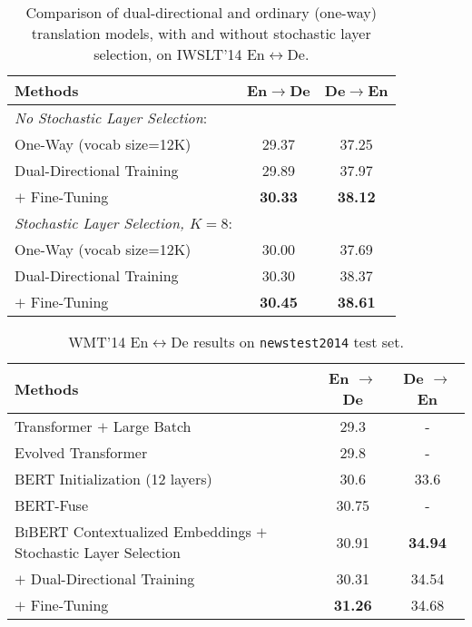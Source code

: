 \documentclass[11pt]{article}
\begin{document}
\begin{table}[ht]
\begin{small}
\centering
\begin{tabular}{lcc}
\hline
Methods  & En$\rightarrow$De & De$\rightarrow$En \\ 
\hline
\textit{No Stochastic Layer Selection}:  &    &    \\ 
\hline
\multicolumn{1}{l|}{One-Way (vocab size=12K)} & \multicolumn{1}{c}{29.37}   & 37.25 \\
\multicolumn{1}{l|}{Dual-Directional Training} & 29.89 & 37.97 \\
\multicolumn{1}{l|}{\quad $+$ Fine-Tuning} & \multicolumn{1}{c}{\textbf{30.33}} & \textbf{\textbf{38.12}} \\

\hline
\textit{Stochastic Layer Selection, $K=8$}:  &    &    \\ 
\hline
\multicolumn{1}{l|}{One-Way (vocab size=12K)} & \multicolumn{1}{c}{30.00}   & 37.69 \\
\multicolumn{1}{l|}{Dual-Directional Training} & 30.30 & 38.37 \\
\multicolumn{1}{l|}{\quad $+$ Fine-Tuning } & \multicolumn{1}{c}{\textbf{30.45}} & \textbf{\textbf{38.61}} \\
\hline

\end{tabular}
\caption{Comparison of dual-directional and ordinary (one-way) translation models, with and without stochastic layer selection, on IWSLT'14 En$\leftrightarrow$De. }
\label{tab:iwslt14-bi}
\end{small}
\end{table}

\begin{table*}[ht]
\begin{small}
\centering
\begin{tabular}{lcc}

\hline
Methods & En $\rightarrow$ De & De $\rightarrow$ En \\
\hline
Transformer $+$ Large Batch  \citep{ott-etal-2018-scaling}  & 29.3 & - \\
Evolved Transformer  \citep{so2019evolved} & 29.8 & - \\
\textsc{BERT} Initialization (12 layers) \citep{rothe-etal-2020-leveraging} & 30.6 &  33.6 \\
\textsc{BERT}-Fuse \citep{Zhu2020Incorporating} & 30.75 & - \\

\hline
\textsc{BiBERT} Contextualized Embeddings $+$ Stochastic Layer Selection & 30.91 & \bf 34.94 \\
\quad $+$ Dual-Directional Training & 30.31 & 34.54 \\
\quad $+$ Fine-Tuning & \bf 31.26 & 34.68 \\
\hline

\end{tabular}
\caption{WMT'14 En$\leftrightarrow$De results on \texttt{newstest2014} test set.}
\label{tab:wmt}
\end{small}
\end{table*}
\end{document}
